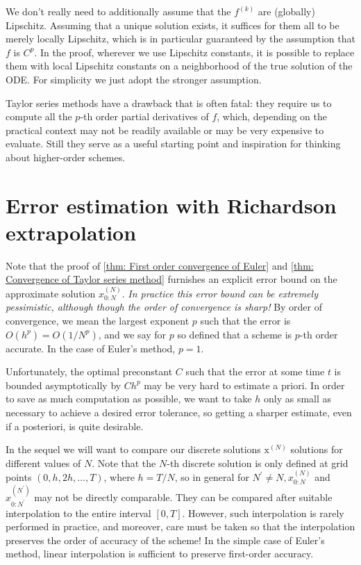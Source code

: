 \begin{remark}
We don't really need to additionally assume that the $f^{(k)}$ are (globally) Lipschitz. Assuming that a unique solution exists, it suffices for them all to be merely locally Lipschitz, which is in particular guaranteed by the assumption that $f$ is $C^p$. In the proof, wherever we use Lipschitz constants, it is possible to replace them with local Lipschitz constants on a neighborhood of the true solution of the ODE. For simplicity we just adopt the stronger assumption.
\end{remark}
Taylor series methods have a drawback that is often fatal: they require us to compute all the $p$-th order partial derivatives of $f$, which, depending on the practical context may not be readily available or may be very expensive to evaluate. Still they serve as a useful starting point and inspiration for thinking about higher-order schemes.

\section{Error estimation with Richardson extrapolation} 

Note that the proof of \autoref{thm: First order convergence of Euler} and \autoref{thm: Convergence of Taylor series method} furnishes an explicit error bound on the approximate solution $x_{0: N}^{(N)}$. \textit{In practice this error bound can be extremely pessimistic, although though the order of convergence is sharp!} By order of convergence, we mean the largest exponent $p$ such that the error is $O\left(h^p\right)=O\left(1 / N^p\right)$, and we say for $p$ so defined that a scheme is $p$-th order accurate. In the case of Euler's method, $p=1$.

Unfortunately, the optimal preconstant $C$ such that the error at some time $t$ is bounded asymptotically by $C h^p$ may be very hard to estimate a priori. In order to save as much computation as possible, we want to take $h$ only as small as necessary to achieve a desired error tolerance, so getting a sharper estimate, even if a posteriori, is quite desirable.

In the sequel we will want to compare our discrete solutions $\mathrm{x}^{(N)}$ solutions for different values of $N$. Note that the $N$-th discrete solution is only defined at grid points $(0, h, 2 h, \ldots, T)$, where $h=T / N$, so in general for $N^{\prime} \neq N, x_{0: N}^{(N)}$ and $x_{0: N^{\prime}}^{\left(N^{\prime}\right)}$ may not be directly comparable. They can be compared after suitable interpolation to the entire interval $[0, T]$. However, such interpolation is rarely performed in practice, and moreover, care must be taken so that the interpolation preserves the order of accuracy of the scheme! In the simple case of Euler's method, linear interpolation is sufficient to preserve first-order accuracy.

